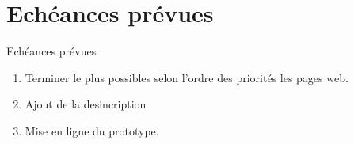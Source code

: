 \documentclass[numbering=fraction]{beamer}
\begin{document}
\section{Echéances prévues}
\begin{frame}{Echéances prévues}
    \begin{enumerate}
        \item Terminer le plus possibles selon l'ordre des priorités les pages web.
        \item Ajout de la desincription  
        \item Mise en ligne du prototype.  
    \end{enumerate}
\end{frame}
\end{document}
